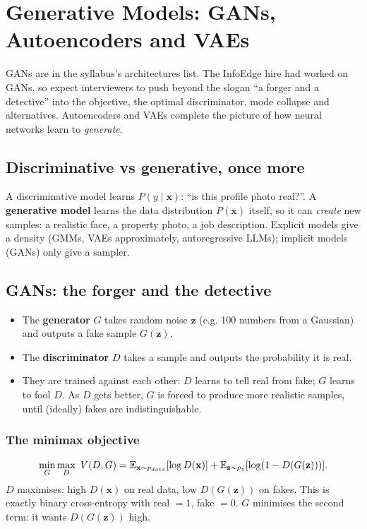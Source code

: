 \chapter{Generative Models: GANs, Autoencoders and VAEs}

GANs are in the syllabus's architectures list. The InfoEdge hire had worked on GANs, so expect interviewers to push beyond the slogan
``a forger and a detective'' into the objective, the optimal discriminator, mode collapse and alternatives. Autoencoders and VAEs complete
the picture of how neural networks learn to \emph{generate}.

\section{Discriminative vs generative, once more}
A discriminative model learns $P(y\mid\mathbf x)$: ``is this profile photo real?''. A \textbf{generative model} learns the data distribution $P(\mathbf x)$
itself, so it can \emph{create} new samples: a realistic face, a property photo, a job description. Explicit models give a density (GMMs, VAEs
approximately, autoregressive LLMs); implicit models (GANs) only give a sampler.

\section{GANs: the forger and the detective}
\begin{itemize}
\item The \textbf{generator} $G$ takes random noise $\mathbf z$ (e.g. 100 numbers from a Gaussian) and outputs a fake sample $G(\mathbf z)$.
\item The \textbf{discriminator} $D$ takes a sample and outputs the probability it is real.
\item They are trained against each other: $D$ learns to tell real from fake; $G$ learns to fool $D$. As $D$ gets better, $G$ is forced to produce more
  realistic samples, until (ideally) fakes are indistinguishable.
\end{itemize}

\subsection{The minimax objective}
\[ \min_G\max_D\ V(D, G) = \mathbb{E}_{\mathbf x\sim p_{data}}[\log D(\mathbf x)] + \mathbb{E}_{\mathbf z\sim p_z}[\log(1 - D(G(\mathbf z)))]. \]
$D$ maximises: high $D(\mathbf x)$ on real data, low $D(G(\mathbf z))$ on fakes. This is exactly binary cross-entropy with real $=1$, fake $=0$.
$G$ minimises the second term: it wants $D(G(\mathbf z))$ high.

